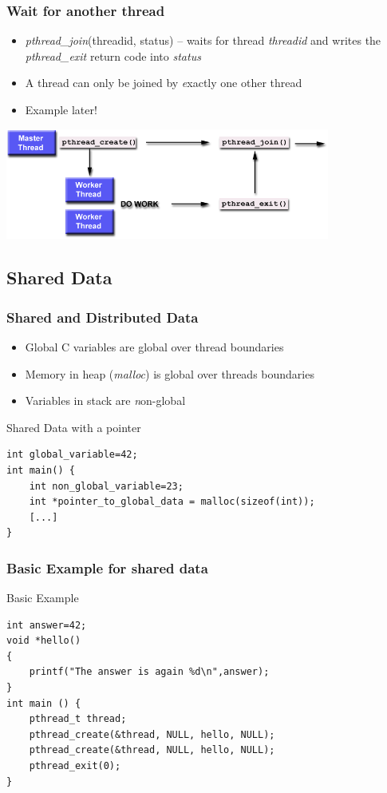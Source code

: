 \documentclass[10pt]{beamer}
\begin{document}
\begin{frame}
    \frametitle{Wait for another thread}
    \begin{itemize}
        \item {\it pthread\_join}(threadid, status) -- waits for thread {\it threadid} and writes the {\it pthread\_exit} return code into {\it status}
        \item A thread can only be joined by {\emph exactly one} other thread
        \item Example later!
    \end{itemize}
    \includegraphics[width=0.8\textwidth]{pictures/joining.png}
\end{frame}


\subsection{Shared Data}

\begin{frame}[fragile]
	\frametitle{Shared and Distributed Data}
	\begin{itemize}
		    \item Global C variables are global over thread boundaries
		    \item Memory in heap ({\it malloc}) is global over threads boundaries
		    \item Variables in stack are {\emph non}-global
		\end{itemize}
\begin{block}{Shared Data with a pointer}
\begin{lstlisting}
int global_variable=42;
int main() {
    int non_global_variable=23;
    int *pointer_to_global_data = malloc(sizeof(int));
    [...]
}
\end{lstlisting}
\end{block}
\end{frame}


\begin{frame}[fragile]
\frametitle{Basic Example for shared data}
\begin{block}{Basic Example}
\begin{lstlisting}
int answer=42;
void *hello()
{
    printf("The answer is again %d\n",answer);
}
int main () {
    pthread_t thread;
    pthread_create(&thread, NULL, hello, NULL);
    pthread_create(&thread, NULL, hello, NULL);
    pthread_exit(0);
}
\end{lstlisting}
\end{block}
\end{frame}
\end{document}
